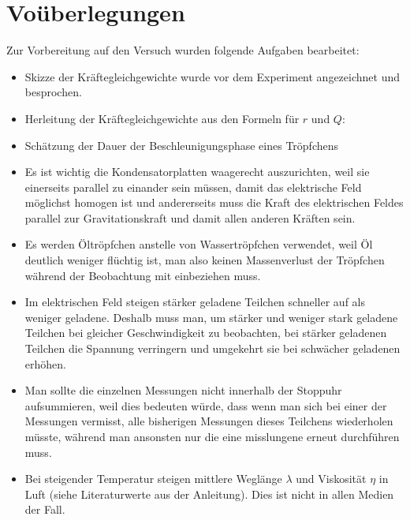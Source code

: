 \documentclass[
	a4paper,
	12pt,
	pagesize,
	ngerman
]{scrartcl}
\begin{document}
	\section{Voüberlegungen}
	Zur Vorbereitung auf den Versuch wurden folgende Aufgaben bearbeitet:
	\begin{itemize}
		\item Skizze der Kräftegleichgewichte wurde vor dem Experiment angezeichnet und besprochen.
		\item Herleitung der Kräftegleichgewichte aus den Formeln für $ r $ und $ Q $: %
		\item Schätzung der Dauer der Beschleunigungsphase eines Tröpfchens %
		\item Es ist wichtig die Kondensatorplatten waagerecht auszurichten, weil sie einerseits parallel zu einander sein müssen, damit das elektrische Feld möglichst homogen ist und andererseits muss die Kraft des elektrischen Feldes parallel zur Gravitationskraft und damit allen anderen Kräften sein.
		\item Es werden Öltröpfchen anstelle von Wassertröpfchen verwendet, weil Öl deutlich weniger flüchtig ist, man also keinen Massenverlust der Tröpfchen während der Beobachtung mit einbeziehen muss.
		\item Im elektrischen Feld steigen stärker geladene Teilchen schneller auf als weniger geladene. Deshalb muss man, um stärker und weniger stark geladene Teilchen bei gleicher Geschwindigkeit zu beobachten, bei stärker geladenen Teilchen die Spannung verringern und umgekehrt sie bei schwächer geladenen erhöhen.
		\item Man sollte die einzelnen Messungen nicht innerhalb der Stoppuhr aufsummieren, weil dies bedeuten würde, dass wenn man sich bei einer der Messungen vermisst, alle bisherigen Messungen dieses Teilchens wiederholen müsste, während man ansonsten nur die eine misslungene erneut durchführen muss.
		\item Bei steigender Temperatur steigen mittlere Weglänge $ \lambda $ und Viskosität $ \eta $ in Luft (siehe Literaturwerte aus der Anleitung). %
		Dies ist nicht in allen Medien der Fall.
	\end{itemize}
	
\end{document}
